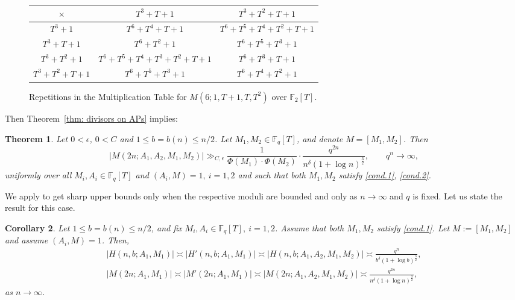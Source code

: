 \documentclass[12pt]{amsart}
\numberwithin{equation}{section}
\newtheorem{theorem}{Theorem}[section]
\newtheorem{corollary}[theorem]{Corollary}
\theoremstyle{definition}
\theoremstyle{remark}
\newcommand{\FF}{\mathbb{F}}
\begin{document}
    \begin{figure}[H]
    \begin{tabular}{c|cc}
      $\times$  & $T^3+T+1$    & $T^3+T^2+T+1$      \\ \hline
      $T^3+1$  &  $T^6 + T^4 + T + 1$ &  $T^6 + T^5 + T^4 + T^2 + T + 1$ \\
      $T^3+T+1$  & $T^6 + T^2 + 1$ &  {\color{RoyalBlue}$T^6 + T^5  + T^3  + 1$}  \\
      $T^3+T^2+1$  & $T^6 + T^5 + T^4 + T^3 + T^2 + T + 1$ &  $T^6 + T^3 + T + 1$   \\
      $T^3+T^2+T+1$ & {\color{RoyalBlue} $T^6 + T^5 + T^3 + 1$} & $T^6 + T^4  + T^2  + 1$ 
    
    \end{tabular}
    \caption{Repetitions in the Multiplication Table for $M(6;1,T+1,T,T^2)$ over $\FF_2[T]$.}
    \end{figure}
    Then Theorem~\ref{thm: divisors on APs} implies:
    \begin{theorem}
        Let $0 < \epsilon$, $0 < C$ and $1\leq b=b(n)\leq n/2$. Let $M_1,M_2 \in \FF_q[T]$, and denote $M=[M_1,M_2]$. Then
        \[
            |M(2n;A_1,A_2,M_1,M_2)| \gg_{C,\epsilon} \frac{1}{\Phi(M_1) \cdot \Phi(M_2)}\cdot \frac{q^{2n}}{n^{\delta}(1+\log n)^{\frac32}}, \qquad q^n\to \infty,
        \]
        uniformly over all $M_i,A_i\in \FF_q[T]$ and $(A_i,M)=1,\ i=1,2$ and such that both $M_1, M_2$ satisfy \eqref{cond.1}, \eqref{cond.2}.
    \end{theorem}
    We apply \cite{Meisner_MT} to get sharp upper bounds only when the respective moduli are bounded and only as $n \to \infty$ and $q$ is fixed. Let us state the result for this case.
    \begin{corollary}\label{thm:M is bounded}
        Let $1\leq b=b(n)\leq n/2$, and fix $M_i,A_i\in \FF_q[T],\ i=1,2$. Assume that both $M_1,M_2$ satisfy \eqref{cond.1}. 
         Let $M:=[M_1,M_2]$ and assume $(A_i,M)=1$. Then,
        \begin{align*}
            |H(n,b;A_1,M_1)| \asymp |H'(n,b;A_1,M_1)| \asymp 
            |H(n,b;A_1,A_2,M_1,M_2)| \asymp \frac{q^{n}}{b^{\delta}(1+\log b)^{\frac32}}, \\
            |M(2n;A_1,M_1)| \asymp |M'(2n;A_1,M_1)| \asymp 
            |M(2n;A_1,A_2,M_1,M_2)| \asymp \frac{q^{2n}}{n^{\delta}(1+\log n)^{\frac32}},
        \end{align*}
        as $n \to \infty$.
    \end{corollary}
\end{document}
